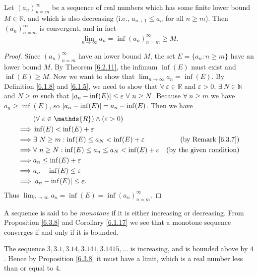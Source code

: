 \begin{additional corollary}\label{ac 6.3.1}
Let \((a_n)_{n = m}^\infty\) be a sequence of real numbers which has some finite lower bound \(M \in \mathds{R}\), and which is also decreasing (i.e., \(a_{n + 1} \leq a_n\) for all \(n \geq m\)).
Then \((a_n)_{n = m}^\infty\) is convergent, and in fact
\[
    \lim_{n \to \infty} a_n = \inf(a_n)_{n = m}^\infty \geq M.
\]
\end{additional corollary}

\begin{proof}
Since \((a_n)_{n = m}^\infty\) have an lower bound \(M\), the set \(E = \{a_n : n \geq m\}\) have an lower bound \(M\).
By Theorem \ref{6.2.11}, the infimum \(\inf(E)\) must exist and \(\inf(E) \geq M\).
Now we want to show that \(\lim_{n \to \infty} a_n = \inf(E)\).
By Definition \ref{6.1.8} and \ref{6.1.5}, we need to show that \(\forall\ \varepsilon \in \mathds{R}\) and \(\varepsilon > 0\), \(\exists\ N \in \mathds{N}\) and \(N \geq m\) such that \(\abs*{a_n - \inf(E)} \leq \varepsilon \ \forall\ n \geq N\).
Because \(\forall\ n \geq m\) we have \(a_n \geq \inf(E)\), so \(\abs*{a_n - \inf(E)} = a_n - \inf(E)\).
Then we have
\begin{align*}
& (\forall\ \varepsilon \in \mathds{R}) \land (\varepsilon > 0) \\
\implies & \inf(E) < \inf(E) + \varepsilon \\
\implies & \exists\ N \geq m : \inf(E) \leq a_N < \inf(E) + \varepsilon & \text{(by Remark \ref{6.3.7})} \\
\implies & \forall\ n \geq N : \inf(E) \leq a_n \leq a_N < \inf(E) + \varepsilon & \text{(by the given condition)} \\
\implies & a_n \leq \inf(E) + \varepsilon \\
\implies & a_n - \inf(E) \leq \varepsilon \\
\implies & \abs*{a_n - \inf(E)} \leq \varepsilon.
\end{align*}
Thus \(\lim_{n \to \infty} a_n = \inf(E) = \inf(a_n)_{n = m}^\infty\).
\end{proof}

\begin{note}
A sequence is said to be \emph{monotone} if it is either increasing or decreasing.
From Proposition \ref{6.3.8} and Corollary \ref{6.1.17} we see that a monotone sequence converges if and only if it is bounded.
\end{note}

\begin{example}\label{6.3.9}
The sequence \(3, 3.1, 3.14, 3.141, 3.1415, \dots\) is increasing, and is bounded above by \(4\).
Hence by Proposition \ref{6.3.8} it must have a limit, which is a real number less than or equal to \(4\).
\end{example}

